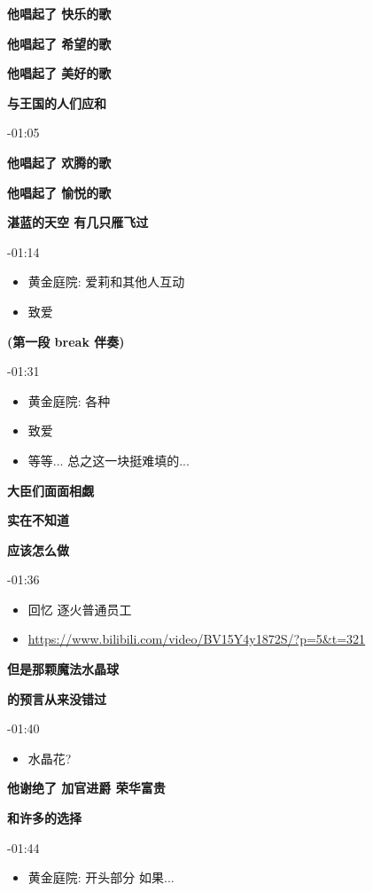 \documentclass[a4paper]{article}
\begin{document}
\textbf{他唱起了 快乐的歌}

\textbf{他唱起了 希望的歌}

\textbf{他唱起了 美好的歌}

\textbf{与王国的人们应和}

-01:05

\textbf{他唱起了 欢腾的歌}

\textbf{他唱起了 愉悦的歌}

\textbf{湛蓝的天空 有几只雁飞过}

-01:14

\begin{itemize}
    \item 黄金庭院: 爱莉和其他人互动
    \item 致爱
\end{itemize}

\textbf{(第一段 break 伴奏)}

-01:31

\begin{itemize}
    \item 黄金庭院: 各种
    \item 致爱
    \item 等等... 总之这一块挺难填的...
\end{itemize}

\textbf{大臣们面面相觑}

\textbf{实在不知道}

\textbf{应该怎么做}

-01:36

\begin{itemize}
    \item 回忆 逐火普通员工
    \item \url{https://www.bilibili.com/video/BV15Y4y1872S/?p=5&t=321}
\end{itemize}

\textbf{但是那颗魔法水晶球}

\textbf{的预言从来没错过}

-01:40

\begin{itemize}
    \item 水晶花?
\end{itemize}

\textbf{他谢绝了 加官进爵 荣华富贵}

\textbf{和许多的选择}

-01:44

\begin{itemize}
    \item 黄金庭院: 开头部分 如果...
\end{itemize}
\end{document}
